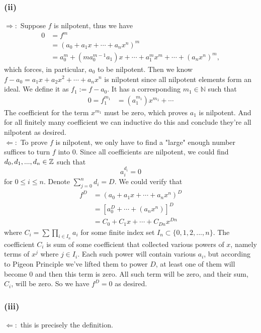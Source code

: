 \subsubsection{(ii)} $\Rightarrow:$ Suppose $f$ is nilpotent, thus we have 
    \begin{align*}
        0&=f^m\\
        &=(a_0+a_1x+\cdots+a_nx^n)^m\\
        &=a_0^m+(ma_0^{m-1}a_1)x+\cdots+a_1^mx^m+\cdots+(a_nx^n)^m,
    \end{align*}which forces, in particular, $a_0$ to be nilpotent. 
    Then we know $f-a_0=a_1x+a_2x^2+\cdots+a_nx^n$ is nilpotent since all nilpotent elements form an ideal. We define it as $f_1:=f-a_0$. It has a corresponding $m_1\in \mathbb{N}$ such that 
    \begin{align*}
        0=f_1^{m_1}&=(a_1^{m_1})x^{m_1}+\cdots
    \end{align*}The coefficient for the term $x^{m_1}$ must be zero, which proves $a_1$ is nilpotent. And for all finitely many coefficient we can inductive do this and conclude they're all nilpotent as desired.\\
    
    \noindent $\Leftarrow:$ To prove $f$ is nilpotent, we only have to find a "large" enough number suffices to turn $f$ into $0$. Since all coefficients are nilpotent, we could find $d_0, d_1,..., d_n\in\mathbb Z$ such that 
    $$a_i^{d_i}=0$$ for $0\leq i\leq n$.
    Denote $\sum_{j=0}^{n} d_i = D$.
    We could verify that 
    \begin{align*}
        f^D&=(a_0+a_1x+\cdots+a_nx^n)^D\\
        &=[a_0^D+\cdots +(a_nx^n)]^D\\
        &=C_0+C_1x+\cdots+C_{Dn}x^{Dn}
    \end{align*}
    where $C_i=\sum \prod_{i\in I_n} a_i$ for some finite index set $I_n\subset \{0,1,2,...,n\}$. The coefficient $C_i$ is sum of some coefficient that collected various powers of $x$, namely terms of $x^j$ where $j\in I_i$. Each such power will contain various $a_i$, but according to Pigeon Principle we've lifted them to power $D$, at least one of them will become $0$ and then this term is zero. All such term will be zero, and their sum, $C_i$, will be zero. So we have $f^D=0$ as desired.

\newpage\subsubsection{(iii)} 
$\Leftarrow:$ this is precisely the definition.\\

